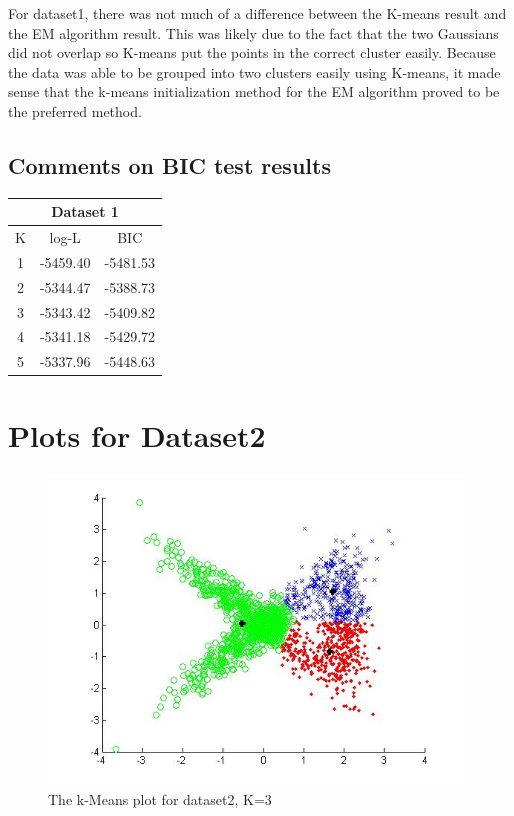\documentclass[11pt,psfig]{article}
\begin{document}
For dataset1, there was not much of a difference between the K-means result and the EM algorithm result. This was likely due to the fact that the two Gaussians did not overlap so K-means put the points in the correct cluster easily. Because the data was able to be grouped into two clusters easily using K-means, it made sense that the k-means initialization method for the EM algorithm proved to be the preferred method. 

\subsection{Comments on BIC test results}

\begin{table}[H]
  \centering
  \begin{tabular}{|c|c|c|}
    \hline
    \multicolumn{3}{|c|}{Dataset 1} \\\hline
    K & log-L & BIC \\\hline
    1 & -5459.40 & -5481.53 \\
		2 & -5344.47 & -5388.73 \\
		3 & -5343.42 & -5409.82 \\
		4 & -5341.18 & -5429.72 \\
    5 & -5337.96 & -5448.63 \\\hline
  \end{tabular}
\end{table}

\section{Plots for Dataset2}

\begin{figure}[H]
\centering
\includegraphics[height=3.25in]{dataset2_kMeansPlot.jpg}
\caption{The k-Means plot for dataset2, K=3}
\end{figure}
\end{document}
